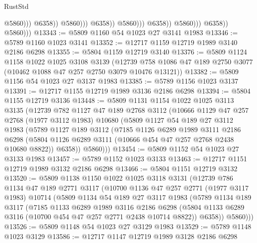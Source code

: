 \begin{lexlean}{RustStd}
\begin{coremodule}
                                                  @5860)))
                                            @6358))
                                        @5860)))
                                  @6358))
                              @5860)))
                        @6358))
                    @5860)))
              @6358))
          @5860)))
@13343 := @5809 @1160 @54 @1023 @27 @3141 @1983
@13346 := @5789 @1160 @1023 @3141
@13352 := @12717 @1159 @12719 @1989 @3140 @2186 @6298
@13355 := @5804 @1159 @12719 @3140
@13376 := @5809
    @1124
    @1158
    @1022
    @1025
    @3108
    @3139
    (@12739 @758 @1086 @47 @189 @2750 @3077 (@10462 @1088 @47 @257 @2750 @3079 @10476 @13121))
@13382 := @5809 @1156 @54 @1023 @27 @3137 @1983
@13385 := @5789 @1156 @1023 @3137
@13391 := @12717 @1155 @12719 @1989 @3136 @2186 @6298
@13394 := @5804 @1155 @12719 @3136
@13448 := @5809
    @1131
    @1154
    @1022
    @1025
    @3113
    @3135
    (@12739
      @782
      @1127
      @47
      @189
      @2768
      @3112
      (@10666
        @1129
        @47
        @257
        @2768
        (@1977 @3112 @1983)
        @10680
        (@5809
          @1127
          @54
          @189
          @27
          @3112
          @1983
          (@5789
            @1127
            @189
            @3112
            (@7185
              @1126
              @6289
              @1989
              @3111
              @2186
              @6298
              (@5804 @1126 @6289 @3111 (@10666 @454 @47 @257 @2768 @2438 @10680 @8822))
              @6358))
          @5860)))
@13454 := @5809 @1152 @54 @1023 @27 @3133 @1983
@13457 := @5789 @1152 @1023 @3133
@13463 := @12717 @1151 @12719 @1989 @3132 @2186 @6298
@13466 := @5804 @1151 @12719 @3132
@13520 := @5809
    @1138
    @1150
    @1022
    @1025
    @3118
    @3131
    (@12739
      @786
      @1134
      @47
      @189
      @2771
      @3117
      (@10700
        @1136
        @47
        @257
        @2771
        (@1977 @3117 @1983)
        @10714
        (@5809
          @1134
          @54
          @189
          @27
          @3117
          @1983
          (@5789
            @1134
            @189
            @3117
            (@7185
              @1133
              @6289
              @1989
              @3116
              @2186
              @6298
              (@5804 @1133 @6289 @3116 (@10700 @454 @47 @257 @2771 @2438 @10714 @8822))
              @6358))
          @5860)))
@13526 := @5809 @1148 @54 @1023 @27 @3129 @1983
@13529 := @5789 @1148 @1023 @3129
@13586 := @12717
    @1147
    @12719
    @1989
    @3128
    @2186
    @6298

\end{coremodule}
\end{lexlean}
